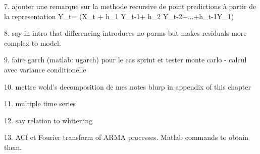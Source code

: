 {7. ajouter une remarque sur la methode recursive de
point predictions \`{a} partir de la representation
 \be Y_t= \left(X_t + h_1 Y_{t-1}+ h_2
 Y_{t-2}+...+h_{t-1}Y_1\right)
 \ee

8. say in intro that differencing introduces no parms
but makes residuals more complex to model.

9. faire garch (matlab: ugarch) pour le cas sprint et
tester monte carlo - calcul avec variance
conditionelle

10. mettre wold's decomposition de mes notes blurp in
appendix of this chapter

11. multiple time series

12. say relation to whitening


13. ACf et Fourier transform of ARMA processes. Matlab
 commands to obtain them.
}
